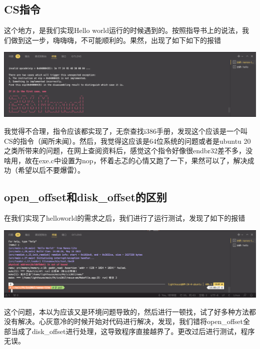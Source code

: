 \documentclass[UTF8,a4paper,10pt]{ctexart}
\begin{document}
\subsection{CS指令}
这个地方，是我们实现Hello world运行的时候遇到的。按照指导书上的说法，我们做到这一步，嗨嗨嗨，不可能顺利的。果然，出现了如下如下的报错
\begin{center}
  \includegraphics*[scale = 0.25]{pic/报错3}
\end{center}
我觉得不合理，指令应该都实现了，无奈查找i386手册，发现这个应该是一个叫CS的指令（闻所未闻）。然后，我觉得这应该是64位系统的问题或者是ubuntu 20之类所带来的问题，在网上查阅资料后，感觉这个指令好像很endbr32差不多，没啥用，故在exe.c中设置为nop，怀着忐忑的心情又跑了一下，果然可以了，解决成功（希望以后不要爆雷）。

\subsection{open\_offset和disk\_offset的区别}
在我们实现了helloworld的需求之后，我们进行了运行测试，发现了如下的报错
\begin{center}
  \includegraphics*[scale = 0.25]{pic/报错5}
\end{center}

这个问题，本以为应该又是环境问题导致的，然后进行一顿找，试了好多种方法都没有解决。心灰意冷的时候开始对代码进行解决，发现，我们错将open\_offset全部当成了disk\_offset进行处理，这导致程序直接越界了。更改过后进行测试，程序无误。
\end{document}
